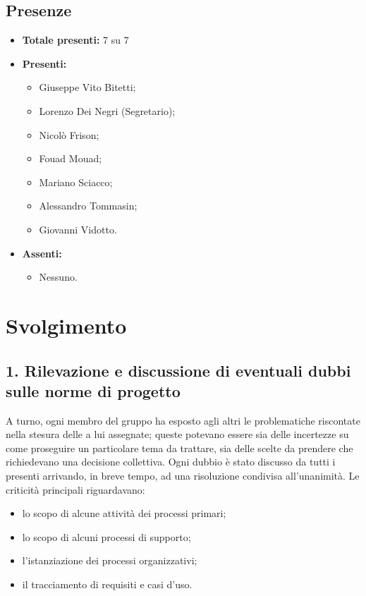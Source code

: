 \subsection*{Presenze}
	\begin{itemize}
		\item \textbf{Totale presenti:} 7 su 7
		\item \textbf{Presenti: }

			\begin{itemize}			
				\item Giuseppe Vito Bitetti;
				\item Lorenzo Dei Negri (Segretario);

				\item Nicolò Frison;
				\item Fouad Mouad;
				\item Mariano Sciacco;
				\item Alessandro Tommasin;
				\item Giovanni Vidotto.
			\end{itemize}

		\item \textbf{Assenti: } 
			\begin{itemize}	

				\item Nessuno.
			\end{itemize}
	\end{itemize}


\newpage
\section*{Svolgimento}

\subsection*{1. Rilevazione e discussione di eventuali dubbi sulle norme di progetto}

A turno, ogni membro del gruppo ha esposto agli altri le problematiche riscontate nella stesura delle  a lui assegnate; queste potevano essere sia delle incertezze su come proseguire un particolare tema da trattare, sia delle scelte da prendere che richiedevano una decisione collettiva.
Ogni dubbio è stato discusso da tutti i presenti arrivando, in breve tempo, ad una risoluzione condivisa all'unanimità.
Le criticità principali riguardavano:
\begin{itemize}
	\item lo scopo di alcune attività dei processi primari;
	\item lo scopo di alcuni processi di supporto;
	\item l'istanziazione dei processi organizzativi;
	\item il tracciamento di requisiti e casi d'uso.
\end{itemize}

